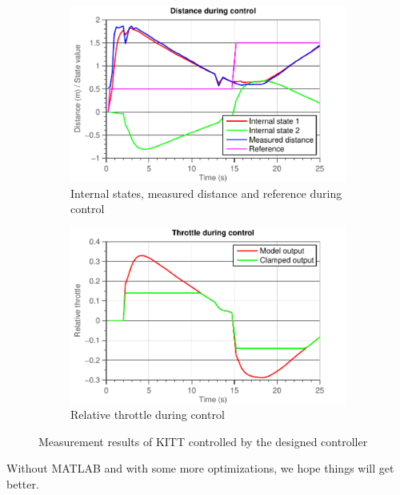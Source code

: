 \documentclass[11pt,titlepage]{report}
\begin{document}
\begin{figure}[H]
	\begin{subfigure}{.5\textwidth}
		\centering
		\includegraphics[width=\linewidth]{resource/measurement-states.pdf}
		\caption{Internal states, measured distance and reference during control}
	\end{subfigure}
	\begin{subfigure}{.5\textwidth}
		\centering
		\includegraphics[width=\linewidth]{resource/measurement-drive.pdf}
		\caption{Relative throttle during control}
	\end{subfigure}
	\caption{Measurement results of KITT controlled by the designed controller}
	\label{fig:ass2-kitt-controlled}
\end{figure}

Without MATLAB and with some more optimizations, we hope things will get better.
\end{document}
